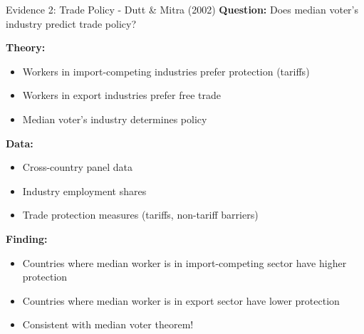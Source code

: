 \documentclass[10pt]{beamer}
\begin{document}
\begin{frame}[allowframebreaks]{Evidence 2: Trade Policy - Dutt \& Mitra (2002)}
\textbf{Question:} Does median voter's industry predict trade policy?



\textbf{Theory:}
\begin{itemize}
\item Workers in import-competing industries prefer \alert{protection} (tariffs)
\item Workers in export industries prefer \alert{free trade}
\item Median voter's industry determines policy
\end{itemize}



\textbf{Data:}
\begin{itemize}
\item Cross-country panel data
\item Industry employment shares
\item Trade protection measures (tariffs, non-tariff barriers)
\end{itemize}

 \framebreak   

\textbf{Finding:}
\begin{itemize}
\item Countries where median worker is in import-competing sector have \alert{higher protection}
\item Countries where median worker is in export sector have \alert{lower protection}
\item \alert{Consistent with median voter theorem!}
\end{itemize}
\end{frame}
\end{document}
